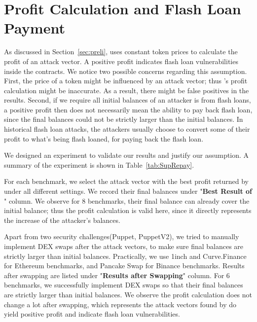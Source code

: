 


\section{Profit Calculation and Flash Loan Payment}
As discussed in Section~\ref{sec:preli}, {\name} uses constant token
prices to calculate the profit of an attack vector. A positive profit
indicates flash loan vulnerabilities inside the contracts. We notice two
possible concerns regarding this assumption. 
First, the price of a token might be influenced by an attack vector; 
thus {\name}'s profit calculation might be inaccurate. As a result, there
might be false positives in the results. Second, if we require all initial
balances of an attacker is from flash loans,
a positive profit then does not necessarily 
mean the ability to pay back flash loan, since the final 
balances could not be strictly larger than the initial balances.
In historical flash loan attacks, the attackers usually choose to convert 
some of their profit to what's being flash loaned, for paying 
back the flash loan.

We designed an experiment to validate our results and justify 
our assumption. A summary of the experiment is shown in Table~\ref{tab:SupRepay}.

For each benchmark, we select the attack vector with 
the best profit returned by {\name} under all different settings.
We record their final balances under "\textbf{Best Result of {\name}}" column. 
We observe for 8 benchmarks, their final balance can 
already cover the initial balance; thus the profit calculation is valid 
here, since it directly represents the increase of the attacker's balances. 

Apart from two security challenges(Puppet, PuppetV2), we tried to manually 
implement DEX swaps after the attack vectors, to make sure final 
balances are strictly larger than initial balances. Practically, 
we use 1inch\cite{1inch} and Curve.Finance\cite{curvefi, egorov2019stableswap} for
Ethereum benchmarks, and Pancake Swap\cite{pancake} for Binance benchmarks. 
Results after swapping are listed under "\textbf{Results after Swapping}" column.
For $6$ benchmarks, we successfully implement DEX swaps so that their final 
balances are strictly larger than initial balances. 
We observe the profit calculation does not change a lot 
after swapping, which represents the attack vectors found by {\name} 
do yield positive profit and indicate flash loan vulnerabilities.

